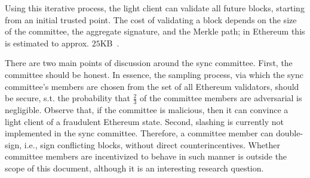 Using this iterative process, the light client can validate all future blocks,
starting from an initial trusted point. The cost of validating a block depends
on the size of the committee, the aggregate signature, and the Merkle path; in
Ethereum this is estimated to approx. $25$KB~\cite{sync-committee}.

There are two main points of discussion around the sync committee.
%
First, the committee should be honest. In essence, the sampling process, via
which the sync committee's members are chosen from the set of all Ethereum
validators, should be secure, s.t. the probability that $\frac{2}{3}$ of the
committee members are adversarial is negligible. Observe that, if the committee
is malicious, then it can convince a light client of a fraudulent Ethereum
state. 
%
Second, slashing is currently not implemented in the sync committee. Therefore,
a committee member can double-sign, i.e., sign conflicting blocks, without
direct counterincentives. Whether committee members are incentivized to behave
in such manner is outside the scope of this document, although it is an
interesting research question.
